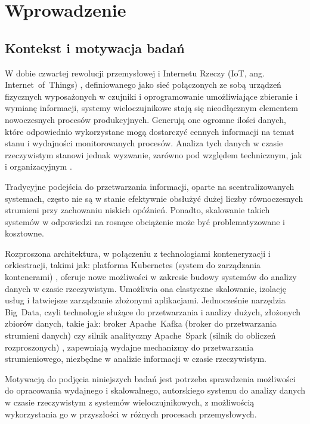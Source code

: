 \section{Wprowadzenie}
\label{sec:wprowadzenie}

\subsection{Kontekst i motywacja badań}
\label{subsec:kontekst}

W dobie czwartej rewolucji przemysłowej \cite{przemysl40_iot_ogolnie} i Internetu Rzeczy (IoT, ang. \mbox{Internet of Things}) \cite{iot_definition_aws}, definiowanego jako sieć połączonych ze sobą urządzeń fizycznych wyposażonych w czujniki i oprogramowanie umożliwiające zbieranie i wymianę informacji, systemy wieloczujnikowe stają się nieodłącznym 
elementem nowoczesnych procesów produkcyjnych. Generują one ogromne ilości danych, które odpowiednio wykorzystane mogą dostarczyć
cennych informacji na temat stanu i wydajności monitorowanych procesów. Analiza tych danych w czasie rzeczywistym stanowi jednak
wyzwanie, zarówno pod względem technicznym, jak i organizacyjnym \cite{realtime_challenges}.

Tradycyjne podejścia do przetwarzania informacji, oparte na scentralizowanych systemach, często nie są w stanie efektywnie obsłużyć
dużej liczby równoczesnych strumieni przy zachowaniu niskich opóźnień. Ponadto, skalowanie takich systemów w odpowiedzi na rosnące
obciążenie może być problematyzowane i kosztowne.

Rozproszona architektura, w połączeniu z technologiami konteneryzacji i orkiestracji, takimi jak: platforma Kubernetes (system do zarządzania kontenerami) \cite{kubernetes_benefits},
oferuje nowe możliwości w zakresie budowy systemów do analizy danych w czasie rzeczywistym. Umożliwia ona elastyczne skalowanie,
izolację usług i łatwiejsze zarządzanie złożonymi aplikacjami. Jednocześnie narzędzia \mbox{Big Data}, czyli technologie służące do przetwarzania i analizy dużych, złożonych zbiorów danych, takie jak: broker \mbox{Apache Kafka} (broker do przetwarzania strumieni danych) czy silnik analityczny \mbox{Apache Spark} (silnik do obliczeń rozproszonych) \cite{kafka, spark_streaming}, zapewniają
wydajne mechanizmy do przetwarzania strumieniowego, niezbędne w analizie informacji w czasie rzeczywistym.

Motywacją do podjęcia niniejszych badań jest potrzeba sprawdzenia możliwości do opracowania wydajnego i skalowalnego, autorskiego systemu do
analizy danych w czasie rzeczywistym z systemów wieloczujnikowych, z możliwością wykorzystania go w przyszłości w różnych procesach przemysłowych.

